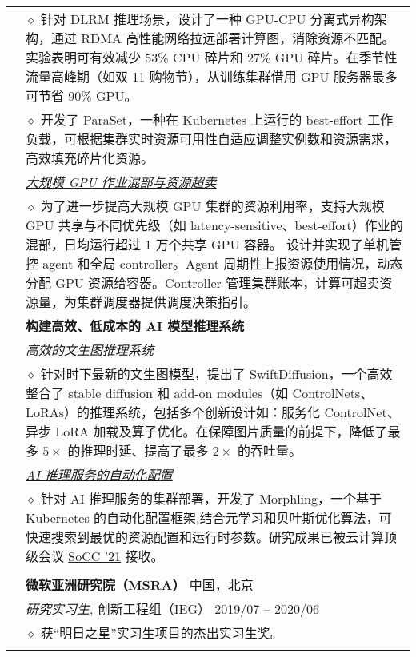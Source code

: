 \documentclass[letterpaper, 10pt]{article}
\begin{document}
\begin{longtable}{p{0.7in}p{6.0in}}
    & $\diamond$ 针对 DLRM 推理场景，设计了一种 GPU-CPU 分离式异构架构，通过 RDMA 高性能网络拉远部署计算图，消除资源不匹配。实验表明可有效减少 53\% CPU 碎片和 27\% GPU 碎片。在季节性流量高峰期（如双 11 购物节），从训练集群借用 GPU 服务器最多可节省 90\% GPU。 \\

    & $\diamond$ 开发了 ParaSet，一种在 Kubernetes 上运行的 best-effort 工作负载，可根据集群实时资源可用性自适应调整实例数和资源需求，高效填充碎片化资源。 \\

& \textit{\underline{大规模 GPU 作业混部与资源超卖}} \\
    & $\diamond$
    为了进一步提高大规模 GPU 集群的资源利用率，支持大规模 GPU 共享与不同优先级（如 latency-sensitive、best-effort）作业的混部，日均运行超过 1 万个共享 GPU 容器。
    设计并实现了单机管控 agent 和全局 controller。Agent 周期性上报资源使用情况，动态分配 GPU 资源给容器。Controller 管理集群账本，计算可超卖资源量，为集群调度器提供调度决策指引。
    \\

& \textbf{构建高效、低成本的 AI 模型推理系统} \\

& \textit{\underline{高效的文生图推理系统}} \\

    & $\diamond$ 针对时下最新的文生图模型，提出了 SwiftDiffusion，一个高效整合了 stable diffusion 和 add-on modules（如 ControlNets、LoRAs）的推理系统，包括多个创新设计如：服务化 ControlNet、异步 LoRA 加载及算子优化。在保障图片质量的前提下，降低了最多 $5\times$ 的推理时延、提高了最多 $2\times$ 的吞吐量。 \\

& \textit{\underline{AI 推理服务的自动化配置}} \\

    & $\diamond$ 针对 AI 推理服务的集群部署，开发了 Morphling，一个基于 Kubernetes 的自动化配置框架,结合元学习和贝叶斯优化算法，可快速搜索到最优的资源配置和运行时参数。研究成果已被云计算顶级会议 \underline{SoCC '21} 接收。 \\
& \\

& {\textbf{微软亚洲研究院（MSRA）}} \hfill 中国，北京 \\
& \textit{研究实习生}, 创新工程组（IEG） \hfill 2019/07 -- 2020/06 \\
& $\diamond$ 获“明日之星”实习生项目的杰出实习生奖。 \\
& \\


\end{longtable}
\end{document}
